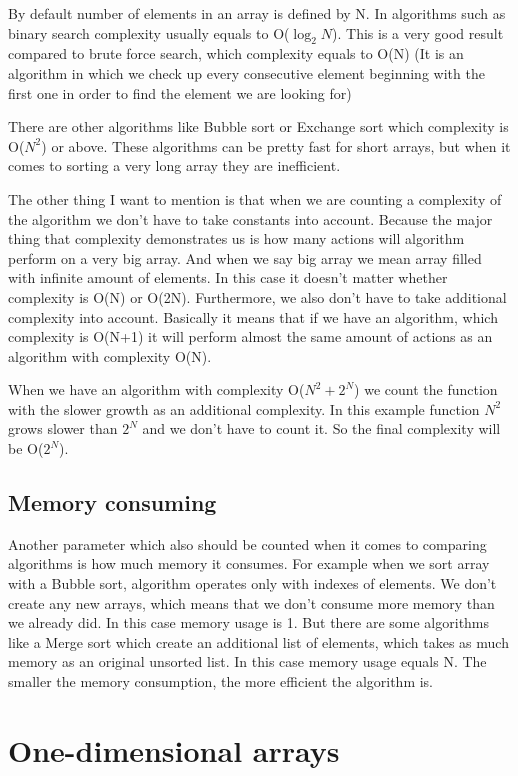 \documentclass[12pt,oneside,a4paper]{article}
\begin{document}
By default number of elements in an array is defined by N.
In algorithms such as binary search complexity usually equals to O($\log_2N$). This is a very good result compared to brute force search, which complexity equals to O(N) (It is an algorithm in which we check up every consecutive element beginning with the first one in order to find the element we are looking for)

There are other algorithms like Bubble sort or Exchange sort which complexity is O($N^{2}$) or above. These algorithms can be pretty fast for short arrays, but when it comes to sorting a very long array they are inefficient.

The other thing I want to mention is that when we are counting a complexity of the algorithm we don't have to take constants into account. Because the major thing that complexity demonstrates us is how many actions will algorithm perform on a very big array. And when we say big array we mean array filled with infinite amount of elements. In this case it doesn't matter whether complexity is O(N) or O(2N). Furthermore, we also don't have to take additional complexity into account. Basically it means that if we have an algorithm, which complexity is O(N+1) it will perform almost the same amount of actions as an algorithm with complexity O(N).

When we have an algorithm with complexity O($N^{2}+2^{N}$) we count the function with the slower growth as an additional complexity. In this example function $N^{2}$ grows slower than $2^{N}$ and we don't have to count it. So the final complexity will be O($2^{N}$).

\subsection{Memory consuming}

Another parameter which also should be counted when it comes to comparing algorithms is how much memory it consumes. For example when we sort array with a Bubble sort, algorithm operates only with indexes of elements. We don't create any new arrays, which means that we don't consume more memory than we already did. In this case memory usage is 1. But there are some algorithms like a Merge sort which create an additional list of elements, which takes as much memory as an original unsorted list. In this case memory usage equals N. The smaller the memory consumption, the more efficient the algorithm is.

\section{One-dimensional arrays} \label{1_dim_arr}
\end{document}
